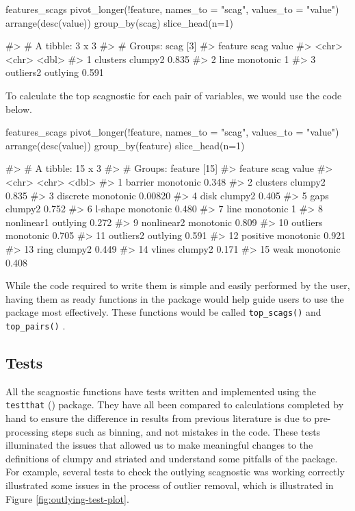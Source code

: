 \begin{Schunk}
\begin{Sinput}
features_scags %
  pivot_longer(!feature, names_to = "scag", values_to = "value") %
  arrange(desc(value)) %
  group_by(scag) %
  slice_head(n=1)
\end{Sinput}
\begin{Soutput}
#> # A tibble: 3 x 3
#> # Groups:   scag [3]
#>   feature   scag      value
#>   <chr>     <chr>     <dbl>
#> 1 clusters  clumpy2   0.835
#> 2 line      monotonic 1    
#> 3 outliers2 outlying  0.591
\end{Soutput}
\end{Schunk}

To calculate the top scagnostic for each pair of variables, we would use
the code below.

\begin{Schunk}
\begin{Sinput}
features_scags %
  pivot_longer(!feature, names_to = "scag", values_to = "value") %
  arrange(desc(value)) %
  group_by(feature) %
  slice_head(n=1)
\end{Sinput}
\begin{Soutput}
#> # A tibble: 15 x 3
#> # Groups:   feature [15]
#>    feature    scag        value
#>    <chr>      <chr>       <dbl>
#>  1 barrier    monotonic 0.348  
#>  2 clusters   clumpy2   0.835  
#>  3 discrete   monotonic 0.00820
#>  4 disk       clumpy2   0.405  
#>  5 gaps       clumpy2   0.752  
#>  6 l-shape    monotonic 0.480  
#>  7 line       monotonic 1      
#>  8 nonlinear1 outlying  0.272  
#>  9 nonlinear2 monotonic 0.809  
#> 10 outliers   monotonic 0.705  
#> 11 outliers2  outlying  0.591  
#> 12 positive   monotonic 0.921  
#> 13 ring       clumpy2   0.449  
#> 14 vlines     clumpy2   0.171  
#> 15 weak       monotonic 0.408
\end{Soutput}
\end{Schunk}

While the code required to write them is simple and easily performed by
the user, having them as ready functions in the package would help guide
users to use the package most effectively. These functions would be
called \texttt{top\_scags()} and \texttt{top\_pairs()} .

\hypertarget{tests}{%
\subsection{Tests}\label{tests}}

All the scagnostic functions have tests written and implemented using
the \texttt{testthat} (\citet{testthat}) package. They have all been
compared to calculations completed by hand to ensure the difference in
results from previous literature is due to pre-processing steps such as
binning, and not mistakes in the code. These tests illuminated the
issues that allowed us to make meaningful changes to the definitions of
clumpy and striated and understand some pitfalls of the package. For
example, several tests to check the outlying scagnostic was working
correctly illustrated some issues in the process of outlier removal,
which is illustrated in Figure \ref{fig:outlying-test-plot}.

